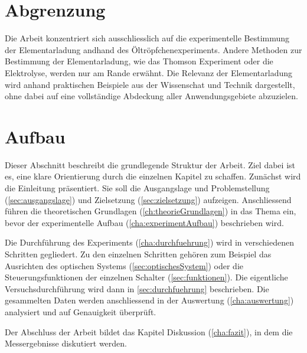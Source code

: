 \section{Abgrenzung}
Die Arbeit konzentriert sich ausschliesslich auf die experimentelle Bestimmung der Elementarladung andhand des Öltröpfchenexperiments. Andere Methoden zur Bestimmung der Elementarladung, wie das Thomson Experiment oder die Elektrolyse, werden nur am Rande erwähnt. Die Relevanz der Elementarladung wird anhand praktischen Beispiele aus der Wissenschat und Technik dargestellt, ohne dabei auf eine vollständige Abdeckung aller Anwendungsgebiete abzuzielen.

\section{Aufbau}
Dieser Abschnitt beschreibt die grundlegende Struktur der Arbeit. Ziel dabei ist es, eine klare Orientierung durch die einzelnen Kapitel zu schaffen. Zunächst wird die Einleitung präsentiert. Sie soll die Ausgangslage und Problemstellung (\autoref{sec:ausgangslage}) und Zielsetzung (\autoref{sec:zielsetzung}) aufzeigen. Anschliessend führen die theoretischen Grundlagen (\autoref{ch:theorieGrundlagen}) in das Thema ein, bevor der experimentelle Aufbau (\autoref{cha:experimentAufbau}) beschrieben wird.

Die Durchführung des Experiments (\autoref{cha:durchfuehrung}) wird in verschiedenen Schritten gegliedert. Zu den einzelnen Schritten gehören zum Beispiel das Ausrichten des optischen Systems (\autoref{sec:optischesSystem}) oder die Steuerungsfunktionen der einzelnen Schalter (\autoref{sec:funktionen}). Die eigentliche Versuchsdurchführung wird dann in \autoref{sec:durchfuehrung} beschrieben. Die gesammelten Daten werden anschliessend in der Auswertung (\autoref{cha:auswertung}) analysiert und auf Genauigkeit überprüft.

Der Abschluss der Arbeit bildet das Kapitel Diskussion (\autoref{cha:fazit}), in dem die Messergebnisse diskutiert werden.